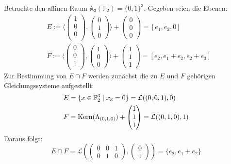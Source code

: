 \documentclass[parskip,a4paper,twoside,DIV15,BCOR12mm]{scrbook}
\begin{document}
\begin{example}
Betrachte den affinen Raum $\mathbb{A}_3(\mathbb{F}_2)=\{0,1\}^3$. Gegeben seien die
Ebenen:
\begin{align*}
&E:=\langle 
\begin{pmatrix}
1\\0\\0\\
\end{pmatrix},
\begin{pmatrix}
0\\1\\0
\end{pmatrix}\rangle +
\begin{pmatrix}
0\\0\\0
\end{pmatrix}=[e_1,e_2,0]\\
&F:=\langle 
\begin{pmatrix}
0\\0\\1\\
\end{pmatrix},
\begin{pmatrix}
1\\0\\0
\end{pmatrix}\rangle +
\begin{pmatrix}
1\\1\\1
\end{pmatrix}=[e_2,e_1+e_2,e_2+e_3]
\end{align*}
Zur Bestimmung von $E\cap F$ werden zunächst die zu $E$ und $F$ gehörigen Gleichungssysteme
aufgestellt:
\begin{align*}
&E=\{x\in\mathbb{F}_2^3\mid x_3=0\}=\mathcal{L}((0,0,1),0)\\
&F=\operatorname{Kern}(\Lambda_{(0,1,0)})+
\begin{pmatrix}
1\\1\\1
\end{pmatrix} = \mathcal{L}((0,1,0),1)
\end{align*}
Daraus folgt:
\[E\cap F=\mathcal{L}(
\begin{pmatrix}
0&0&1\\
0&1&0
\end{pmatrix},
\begin{pmatrix}
0\\1
\end{pmatrix})=\{e_2,e_1+e_2\}\]
\end{example}
\end{document}
